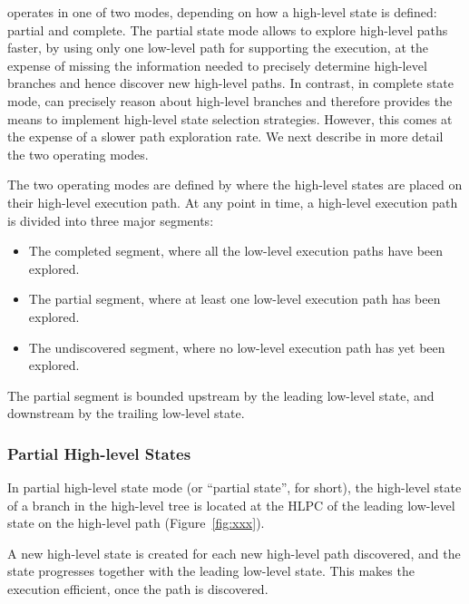 \chef operates in one of two modes, depending on how a high-level state is defined: partial and complete.
%
The partial state mode allows \chef to explore high-level paths faster, by using only one low-level path for supporting the execution, at the expense of missing the information needed to precisely determine high-level branches and hence discover new high-level paths.
%
In contrast, in complete state mode, \chef can precisely reason about high-level branches and therefore provides the means to implement high-level state selection strategies.  However, this comes at the expense of a slower path exploration rate.
%
We next describe in more detail the two \chef operating modes.

The two operating modes are defined by where the high-level states are placed on their high-level execution path.  At any point in time, a high-level execution path is divided into three major segments:
\begin{itemize}
\item The completed segment, where all the low-level execution paths have been explored.
\item The partial segment, where at least one low-level execution path has been explored.
\item The undiscovered segment, where no low-level execution path has yet been explored.
\end{itemize}

The partial segment is bounded upstream by the leading low-level state, and downstream by the trailing low-level state.

\subsubsection{Partial High-level States}


In partial high-level state mode (or ``partial state'', for short), the high-level state of a branch in the high-level tree is located at the HLPC of the leading low-level state on the high-level path (Figure~\ref{fig:xxx}).


A new high-level state is created for each new high-level path discovered, and the state progresses together with the leading low-level state.
%
This makes the execution efficient, once the path is discovered.

